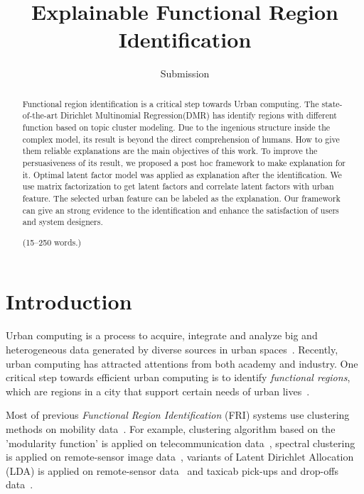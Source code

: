 \documentclass[runningheads]{llncs}
\begin{document}
\title{Explainable Functional Region Identification}
\author{Submission}

\maketitle

\begin{abstract}
Functional region identification is a critical step towards Urban computing.
The state-of-the-art Dirichlet Multinomial Regression(DMR) has identify regions with different function based on topic cluster modeling.
Due to the ingenious structure inside the complex model, its result is beyond the direct comprehension of humans.
How to give them reliable explanations are the main objectives of this work.
To improve the persuasiveness of its result, we proposed a post hoc framework to make explanation for it.
Optimal latent factor model was applied as explanation after the identification.
We use matrix factorization to get latent factors and correlate latent factors with urban feature.
The selected urban feature can be labeled as the explanation.
Our framework can give an strong evidence to the identification and enhance the satisfaction of users and system designers.

(15--250 words.)

\end{abstract}
%


\section{Introduction}
Urban computing is a process to acquire, integrate and analyze big and heterogeneous data generated by diverse sources in urban spaces~\cite{Zheng2014UrbanConcepts}. 
Recently, urban computing has attracted attentions from both academy and industry.
One critical step towards efficient urban computing is to identify \emph{functional regions}, which are regions in a city that support certain needs of urban lives~\cite{Yuan2012FunctionRegion,Yuan2015FunctionRegion}.

Most of previous \emph{Functional Region Identification} (FRI) systems use clustering methods on mobility data~\cite{Karlsson2006FunctionalRegionSummary}.
For example, clustering algorithm based on the 'modularity function' is applied on telecommunication data~\cite{Newman2004ModularityFunction,Ratti2010Telecom}, spectral clustering is applied on remote-sensor image data~\cite{Vatsavai2011Remote}, variants of Latent Dirichlet Allocation (LDA) is applied on remote-sensor data~\cite{Vatsavai2010Remote} and taxicab pick-ups and drop-offs data~\cite{Yuan2012FunctionRegion,Yuan2015FunctionRegion}.
\end{document}
